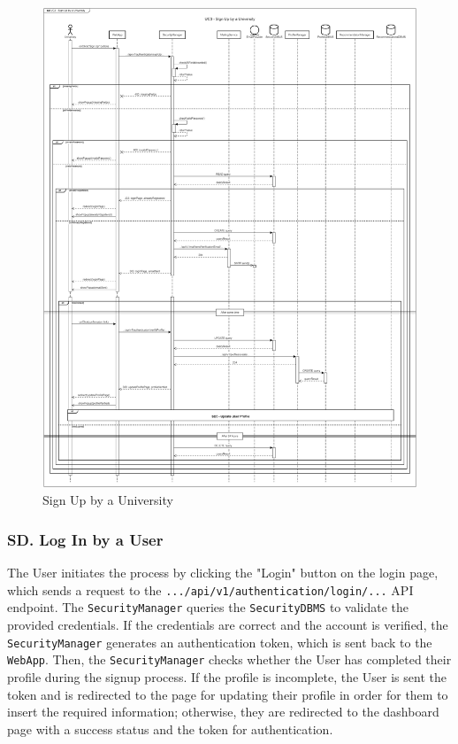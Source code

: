 \begin{figure}[H]
    \begin{center}
         \includegraphics[width=0.9\linewidth]{LaTeXCode/images/SequenceDiagrams/UC3-sequenceDiagram.png}
         \caption{Sign Up by a University}
         \label{fig:signup_university_sd}
     \end{center}
\end{figure}

\subsubsection*{SD\cuc. Log In by a User}
\label{subsubsec:login_user_sd}
The User initiates the process by clicking the "Login" button on the login page, which sends a request to the \texttt{.../api/v1/authentication/login/...} API endpoint. The \texttt{SecurityManager} queries the \texttt{SecurityDBMS} to validate the provided credentials.
If the credentials are correct and the account is verified, the \texttt{SecurityManager} generates an authentication token, which is sent back to the \texttt{WebApp}. Then, the \texttt{SecurityManager} checks whether the User has completed their profile during the signup process. If the profile is incomplete, the User is sent the token and is redirected to the page for updating their profile in order for them to insert the required information; otherwise, they are redirected to the dashboard page with a success status and the token for authentication.

